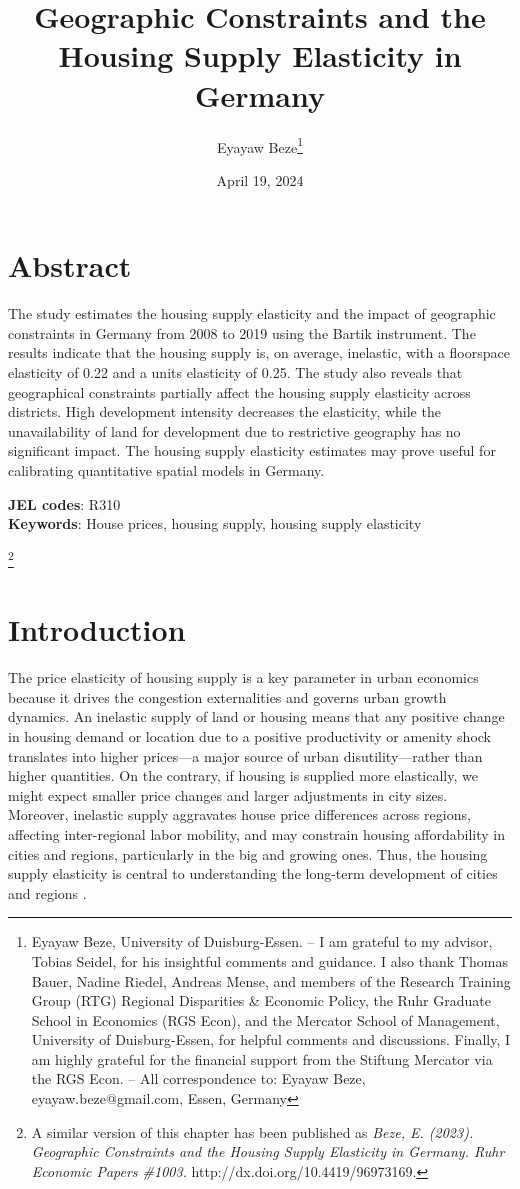 \documentclass[
  12pt,
]{article}
\title{Geographic Constraints and the Housing Supply Elasticity in
Germany}
\author{Eyayaw Beze\footnote{Eyayaw Beze, University of Duisburg-Essen.
  -- I am grateful to my advisor, Tobias Seidel, for his insightful
  comments and guidance. I also thank Thomas Bauer, Nadine Riedel,
  Andreas Mense, and members of the Research Training Group (RTG)
  Regional Disparities \& Economic Policy, the Ruhr Graduate School in
  Economics (RGS Econ), and the Mercator School of Management,
  University of Duisburg-Essen, for helpful comments and discussions.
  Finally, I am highly grateful for the financial support from the
  Stiftung Mercator via the RGS Econ. -- All correspondence to: Eyayaw
  Beze, eyayaw.beze@gmail.com, Essen, Germany}}
\date{April 19, 2024}
\newcommand\blfootnote[1]{%
  \begingroup
  \renewcommand\thefootnote{}\footnote{#1}%
  \addtocounter{footnote}{-1}%
  \endgroup
}
\begin{document}
\maketitle


\section*{Abstract}\label{abstract}

The study estimates the housing supply elasticity and the impact of
geographic constraints in Germany from 2008 to 2019 using the Bartik
instrument. The results indicate that the housing supply is, on average,
inelastic, with a floorspace elasticity of 0.22 and a units elasticity
of 0.25. The study also reveals that geographical constraints partially
affect the housing supply elasticity across districts. High development
intensity decreases the elasticity, while the unavailability of land for
development due to restrictive geography has no significant impact. The
housing supply elasticity estimates may prove useful for calibrating
quantitative spatial models in Germany.

\textbf{JEL codes}: R310\\
\textbf{Keywords}: House prices, housing supply, housing supply
elasticity

\blfootnote{A similar version of this chapter has been published as \textit{Beze, E. (2023). Geographic Constraints and the Housing Supply Elasticity in Germany. Ruhr Economic Papers \#1003.} http://dx.doi.org/10.4419/96973169.}


\newpage

\section{Introduction}\label{introduction}


The price elasticity of housing supply is a key parameter in urban
economics because it drives the congestion externalities and governs
urban growth dynamics. An inelastic supply of land or housing means that
any positive change in housing demand or location due to a positive
productivity or amenity shock translates into higher prices---a major
source of urban disutility---rather than higher quantities. On the
contrary, if housing is supplied more elastically, we might expect
smaller price changes and larger adjustments in city sizes. Moreover,
inelastic supply aggravates house price differences across regions,
affecting inter-regional labor mobility, and may constrain housing
affordability in cities and regions, particularly in the big and growing
ones. Thus, the housing supply elasticity is central to understanding
the long-term development of cities and regions
\citep{combes_etal_2019, glaeser_etal_2006, saks_2008, lerbs_2014}.
\end{document}
